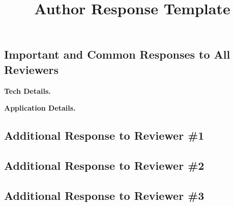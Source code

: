 \documentclass[10pt,twocolumn,letterpaper]{article}
\begin{document}
\title{Author Response Template}  %

\maketitle
\thispagestyle{empty}


\subsection*{\normalsize \bf  Important and Common Responses to All Reviewers}
\textbf{Tech Details.}

\textbf{Application Details.}


\subsection*{\normalsize \bf  Additional Response to Reviewer \#1}
\vspace{-1mm}

\subsection*{\normalsize \bf  Additional Response to Reviewer \#2}
\vspace{-1mm}

\subsection*{\normalsize \bf  Additional Response to Reviewer \#3}
\vspace{-1mm}
\end{document}
